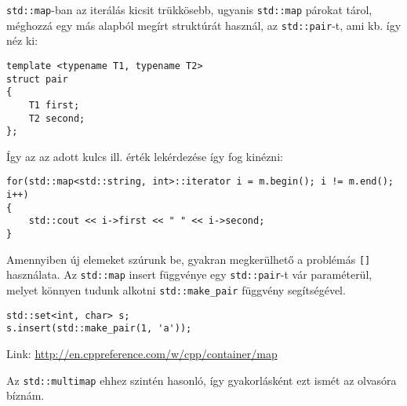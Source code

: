 \documentclass[a4paper,11.5pt,table]{article}
\begin{document}
	
	\texttt{std::map}-ban az iterálás kicsit trükkösebb, ugyanis \texttt{std::map} párokat tárol, méghozzá egy más alapból megírt struktúrát használ, az \texttt{std::pair}-t, ami kb. így néz ki:
	\begin{lstlisting}
template <typename T1, typename T2>
struct pair
{
	T1 first;
	T2 second;
};
	\end{lstlisting}
	Így az az adott kulcs ill. érték lekérdezése így fog kinézni:
	\begin{lstlisting}
for(std::map<std::string, int>::iterator i = m.begin(); i != m.end(); i++)
{
	std::cout << i->first << " " << i->second;
}
	\end{lstlisting}
	Amennyiben új elemeket szúrunk be, gyakran megkerülhető a problémás \texttt{[]} használata. Az \texttt{std::map} insert függvénye egy \texttt{std::pair}-t vár paraméterül, melyet könnyen tudunk alkotni \texttt{std::make\_pair} függvény segítségével.
	\begin{lstlisting}
std::set<int, char> s;
s.insert(std::make_pair(1, 'a'));
	\end{lstlisting}
	
	Link: \url{http://en.cppreference.com/w/cpp/container/map}
	\begin{note}
		Az \texttt{std::multimap} ehhez szintén hasonló, így gyakorlásként ezt ismét az olvasóra bíznám.
	\end{note}
\end{document}
